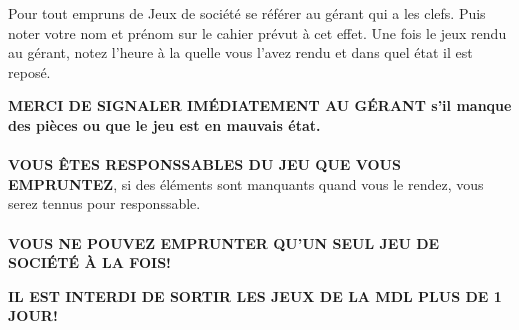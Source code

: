 \documentclass[12pt,a4paper]{article}
\begin{document}
\begin{center}
        \shadowbox{\begin{large}
                \textcolor{black}{Emprunts Jeux de société }
        \end{large}}
    \end{center}
    \vspace{0.5 cm}
\begin{deb}\par
Pour tout empruns de Jeux de société se référer au gérant qui a les clefs.
Puis noter votre nom et prénom sur le cahier prévut à cet effet.
Une fois le jeux rendu au gérant, notez l'heure à la quelle vous l'avez rendu et dans quel état il est reposé. \par
\textbf{MERCI DE SIGNALER IM\'EDIATEMENT AU G\'ERANT s'il manque des pièces ou que le jeu est en mauvais état.} \\ \\
\textbf{VOUS \^ETES RESPONSSABLES DU JEU QUE VOUS EMPRUNTEZ}, si des éléments sont manquants quand vous le rendez, vous serez tennus pour responssable. \\ \\
\textbf{VOUS NE POUVEZ EMPRUNTER QU'UN SEUL JEU DE SOCI\'ET\'E \`A LA FOIS!}\par 

\textbf{IL EST INTERDI DE SORTIR LES JEUX DE LA MDL PLUS DE 1 JOUR!}
\end{deb}
\end{document}
